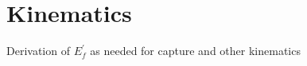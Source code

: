 \graphicspath{{img/appendix_1/}}
\chapter{Kinematics}
\label{appendix:Kinematics}

\begin{synopsis}
  Derivation of $E_f^{'}$ as needed for capture and other kinematics
\end{synopsis}
